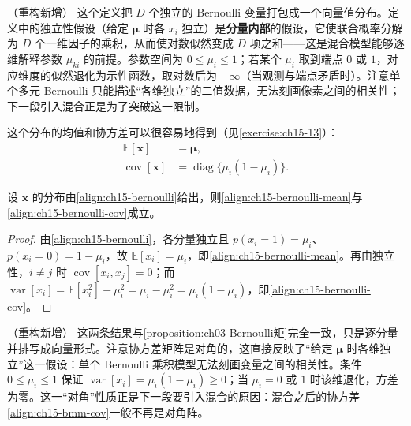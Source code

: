 \documentclass[../../main.tex]{subfiles}
\begin{document}
\begin{remark}（重构新增）
这个定义把 $D$ 个独立的 Bernoulli 变量打包成一个向量值分布。定义中的独立性假设（给定 $\bm{\mu}$ 时各 $x_i$ 独立）是\textbf{分量内部}的假设，它使联合概率分解为 $D$ 个一维因子的乘积，从而使对数似然变成 $D$ 项之和——这是混合模型能够逐维解释参数 $\mu_{ki}$ 的前提。参数空间为 $0\leqslant\mu_i\leqslant1$；若某个 $\mu_i$ 取到端点 $0$ 或 $1$，对应维度的似然退化为示性函数，取对数后为 $-\infty$（当观测与端点矛盾时）。注意单个多元 Bernoulli 只能描述“各维独立”的二值数据，无法刻画像素之间的相关性；下一段引入混合正是为了突破这一限制。
\end{remark}

这个分布的均值和协方差可以很容易地得到（见\cref{exercise:ch15-13}）：
\begin{align}
\mathbb{E}[\bm{x}]&=\bm{\mu},
\label{align:ch15-bernoulli-mean}\\
\operatorname{cov}[\bm{x}]&=\operatorname{diag}\{\mu_i(1-\mu_i)\}.
\label{align:ch15-bernoulli-cov}
\end{align}

\begin{proposition}\label{proposition:ch15-Bernoulli矩}
设 $\bm{x}$ 的分布由\eqref{align:ch15-bernoulli}给出，则\eqref{align:ch15-bernoulli-mean}与\eqref{align:ch15-bernoulli-cov}成立。
\end{proposition}
\begin{proof}
由\eqref{align:ch15-bernoulli}，各分量独立且 $p(x_i=1)=\mu_i$、$p(x_i=0)=1-\mu_i$，故 $\mathbb{E}[x_i]=\mu_i$，即\eqref{align:ch15-bernoulli-mean}。再由独立性，$i\neq j$ 时 $\operatorname{cov}[x_i,x_j]=0$；而 $\operatorname{var}[x_i]=\mathbb{E}[x_i^{2}]-\mu_i^{2}=\mu_i-\mu_i^{2}=\mu_i(1-\mu_i)$，即\eqref{align:ch15-bernoulli-cov}。
\end{proof}

\begin{remark}（重构新增）
这两条结果与\cref{proposition:ch03-Bernoulli矩}完全一致，只是逐分量并排写成向量形式。注意协方差矩阵是对角的，这直接反映了“给定 $\bm{\mu}$ 时各维独立”这一假设：单个 Bernoulli 乘积模型无法刻画变量之间的相关性。条件 $0\leqslant\mu_i\leqslant1$ 保证 $\operatorname{var}[x_i]=\mu_i(1-\mu_i)\geqslant0$；当 $\mu_i=0$ 或 $1$ 时该维退化，方差为零。这一“对角”性质正是下一段要引入混合的原因：混合之后的协方差\eqref{align:ch15-bmm-cov}一般不再是对角阵。
\end{remark}
\end{document}
